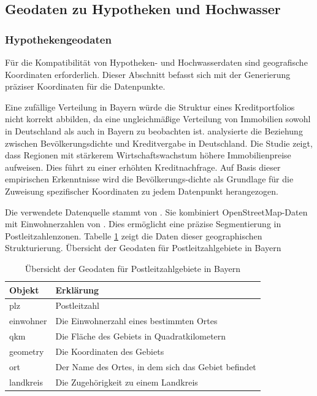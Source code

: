 \subsection{Geodaten zu Hypotheken und Hochwasser}
\subsubsection{Hypothekengeodaten}\label{sec:hypogeo}

Für die Kompatibilität von Hypotheken- und Hochwasserdaten sind geografische Koordinaten erforderlich. Dieser Abschnitt befasst sich mit der Generierung präziser Koordinaten für die Datenpunkte.

Eine zufällige Verteilung in Bayern würde die Struktur eines Kreditportfolios nicht korrekt abbilden, da eine ungleichmäßige Verteilung von Immobilien sowohl in Deutschland als auch in Bayern zu beobachten ist. \textcite{zurek2022real} analysierte die Beziehung zwischen Bevölkerungsdichte und Kreditvergabe in Deutschland. Die Studie zeigt, dass Regionen mit stärkerem Wirtschaftswachstum höhere Immobilienpreise aufweisen. Dies führt zu einer erhöhten Kreditnachfrage. Auf Basis dieser empirischen Erkenntnisse wird die Bevölkerungs-dichte als Grundlage für die Zuweisung spezifischer Koordinaten zu jedem Datenpunkt herangezogen.

Die verwendete Datenquelle stammt von \textcite{suche_postleitzahl}. Sie kombiniert OpenStreetMap-Daten mit Einwohnerzahlen von \textcite{destatis}. Dies ermöglicht eine präzise Segmentierung in Postleitzahlenzonen. Tabelle \ref{tab:geodaten} zeigt die Daten dieser geographischen Strukturierung.
Übersicht der Geodaten für Postleitzahlgebiete in Bayern
\begin{table}[htbp]
    \centering
    \small
    \caption{Übersicht der Geodaten für Postleitzahlgebiete in Bayern}
    \label{tab:geodaten}
    \begin{tabularx}{1.0\textwidth}{>{\raggedright\arraybackslash}X >{\raggedright\arraybackslash}X}
        \toprule
        \textbf{Objekt} & \textbf{Erklärung} \\
        \midrule
        plz & Postleitzahl \\
        \addlinespace
        einwohner & Die Einwohnerzahl eines bestimmten Ortes \\
        \addlinespace
        qkm & Die Fläche des Gebiets in Quadratkilometern \\
        \addlinespace
        geometry & Die Koordinaten des Gebiets \\
        \addlinespace
        ort & Der Name des Ortes, in dem sich das Gebiet befindet \\
        \addlinespace
        landkreis & Die Zugehörigkeit zu einem Landkreis \\
        \bottomrule
    \end{tabularx}
\end{table}
\FloatBarrier


